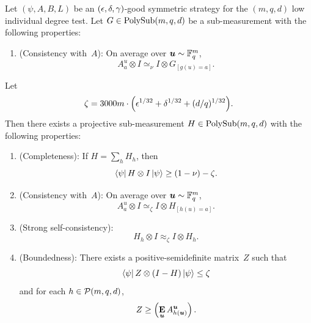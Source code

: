 \begin{theorem}\label{thm:self-improvement-in-induction-section}
  Let $(\psi, A, B, L)$ be an $(\epsilon, \delta, \gamma)$-good symmetric strategy for the $(m,q,d)$ low individual degree test.
Let $G \in \mathrm{PolySub}(m, q, d)$ be a sub-measurement with the following properties:
\begin{enumerate}

  \item (Consistency with~$A$): \label{item:si-inductive-G-consistency} On average over $\boldsymbol{u} \sim \mathbb F_q^{m}$,
	  \begin{equation*}
	  A^{u}_a \otimes I \simeq_{\nu} I \otimes G_{[g(u)=a]}.
	  \end{equation*}
	  \end{enumerate}
Let
\begin{equation*}
\zeta = 3000m\cdot \Big(\epsilon^{1/32} + \delta^{1/32} + (d/q)^{1/32}\Big).
\end{equation*}
Then there exists a projective sub-measurement $H \in \mathrm{PolySub}(m, q, d)$ with the following properties:
\begin{enumerate}
    \item(Completeness):  \label{item:si-inductive-completeness} If $H =  \sum_h H_h$, then
    \begin{equation*}
    \bra{\psi} H \otimes I \ket{\psi} \geq (1-\nu)-\zeta.
    \end{equation*}
    \item(Consistency with~$A$):\label{item:si-inductive-A-consistency} On average over $\boldsymbol{u} \sim \mathbb F_q^m$,
        \begin{equation*}
            A^u_a \otimes I \simeq_{\zeta} I \otimes H_{[h(u) = a]}.
        \end{equation*}
    \item(Strong self-consistency): \label{item:si-inductive-self}
    	\begin{equation*}
		H_h \otimes I \approx_{\zeta} I \otimes H_h.
	\end{equation*}
    \item(Boundedness): \label{item:si-inductive-boundedness} There exists a positive-semidefinite matrix~$Z$ such that
    \begin{equation*}
        \bra{\psi} Z \otimes (I - H) \ket{\psi} \leq \zeta
    \end{equation*}
    and for each $h \in \mathcal{P}(m, q, d)$,
	\begin{equation*}
	Z \geq \left(\mathop{\bf E\/}_{\boldsymbol{u}} A^{\boldsymbol{u}}_{h(\boldsymbol{u})}\right).
	\end{equation*}
\end{enumerate}
\end{theorem}

